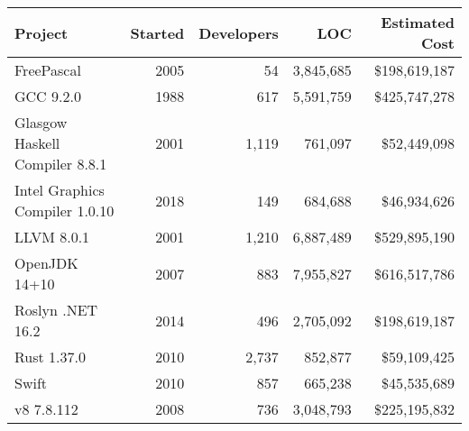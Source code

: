 \begin{tabular}{ | L{3.5cm} r r r r |}
  \hline
  \textbf{Project} & \textbf{Started} & \textbf{Developers} & \textbf{LOC} & \textbf{Estimated Cost} \\
  \hline
  FreePascal & 2005 & 54 & 3,845,685 & \$198,619,187 \\
  GCC 9.2.0 & 1988 & 617 & 5,591,759 & \$425,747,278 \\
  Glasgow Haskell Compiler 8.8.1 & 2001 & 1,119 & 761,097 & \$52,449,098 \\
  Intel Graphics Compiler 1.0.10 & 2018 & 149 & 684,688 & \$46,934,626 \\
  LLVM 8.0.1 & 2001 & 1,210 & 6,887,489 & \$529,895,190 \\
  OpenJDK 14+10 & 2007 & 883 & 7,955,827 & \$616,517,786 \\
  Roslyn .NET 16.2 & 2014 & 496 & 2,705,092 & \$198,619,187 \\
  Rust 1.37.0 & 2010 & 2,737 & 852,877 & \$59,109,425\\
  Swift & 2010 & 857 & 665,238 & \$45,535,689 \\
  v8 7.8.112 & 2008 & 736 & 3,048,793 & \$225,195,832\\
  \hline
\end{tabular}
